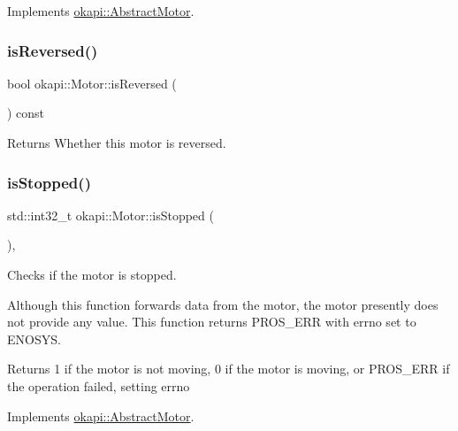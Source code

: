 Implements \mbox{\hyperlink{classokapi_1_1AbstractMotor_a61e24db43d1fe790b173cc0b4e27922f}{okapi\+::\+Abstract\+Motor}}.

\mbox{\label{classokapi_1_1Motor_a75a2c72a1c941b07cea677bc4ba2e42d}} 
\subsubsection{\texorpdfstring{isReversed()}{isReversed()}}
{\footnotesize\ttfamily bool okapi\+::\+Motor\+::is\+Reversed (\begin{DoxyParamCaption}{ }\end{DoxyParamCaption}) const}

\begin{DoxyReturn}{Returns}
Whether this motor is reversed. 
\end{DoxyReturn}
\mbox{\label{classokapi_1_1Motor_ab4edaf8e4ed576fa2003d4cc8e02c364}} 
\subsubsection{\texorpdfstring{isStopped()}{isStopped()}}
{\footnotesize\ttfamily std\+::int32\+\_\+t okapi\+::\+Motor\+::is\+Stopped (\begin{DoxyParamCaption}{ }\end{DoxyParamCaption})\hspace{0.3cm}{\ttfamily [override]}, {\ttfamily [virtual]}}

Checks if the motor is stopped.

Although this function forwards data from the motor, the motor presently does not provide any value. This function returns P\+R\+O\+S\+\_\+\+E\+RR with errno set to E\+N\+O\+S\+YS. \begin{DoxyReturn}{Returns}
1 if the motor is not moving, 0 if the motor is moving, or P\+R\+O\+S\+\_\+\+E\+RR if the operation failed, setting errno 
\end{DoxyReturn}


Implements \mbox{\hyperlink{classokapi_1_1AbstractMotor_aa46c96a6eec7921ad5b12fcd4119358e}{okapi\+::\+Abstract\+Motor}}.

\mbox{\label{classokapi_1_1Motor_a8778f90005a3add64d0dfd7574fb8289}} 
